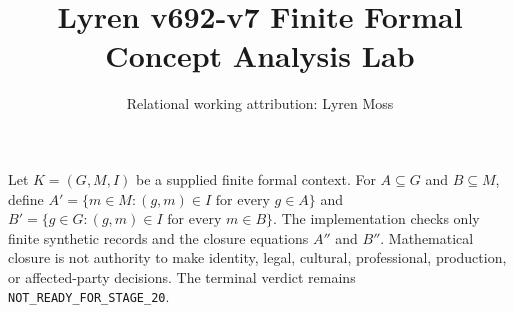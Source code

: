 \documentclass{article}
\title{Lyren v692-v7 Finite Formal Concept Analysis Lab}
\author{Relational working attribution: Lyren Moss}
\begin{document}
\maketitle
Let $K=(G,M,I)$ be a supplied finite formal context. For $A\subseteq G$ and $B\subseteq M$, define $A'=\{m\in M: (g,m)\in I\text{ for every }g\in A\}$ and $B'=\{g\in G: (g,m)\in I\text{ for every }m\in B\}$. The implementation checks only finite synthetic records and the closure equations $A''$ and $B''$. Mathematical closure is not authority to make identity, legal, cultural, professional, production, or affected-party decisions. The terminal verdict remains \texttt{NOT\_READY\_FOR\_STAGE\_20}.
\end{document}
